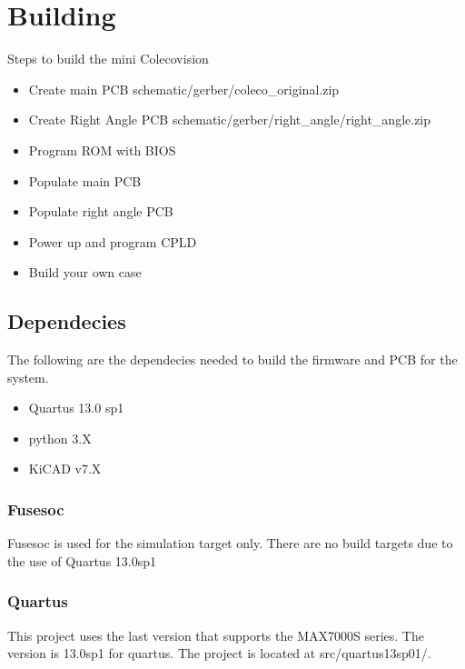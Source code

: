 \section{Building}

\par
Steps to build the mini Colecovision

\begin{itemize}
  \item Create main PCB schematic/gerber/coleco\_original.zip
  \item Create Right Angle PCB schematic/gerber/right\_angle/right\_angle.zip
  \item Program ROM with BIOS
  \item Populate main PCB
  \item Populate right angle PCB
  \item Power up and program CPLD
  \item Build your own case
\end{itemize}
\par

\subsection{Dependecies}

\par
The following are the dependecies needed to build the firmware and PCB for the system.

\begin{itemize}
  \item Quartus 13.0 sp1
  \item python 3.X
  \item KiCAD v7.X
\end{itemize}



\subsubsection{Fusesoc}


\par
Fusesoc is used for the simulation target only. There are no build targets due to the use of Quartus 13.0sp1

\subsubsection{Quartus}
\par
This project uses the last version that supports the MAX7000S series. The version is 13.0sp1 for quartus.
The project is located at src/quartus13sp01/.


